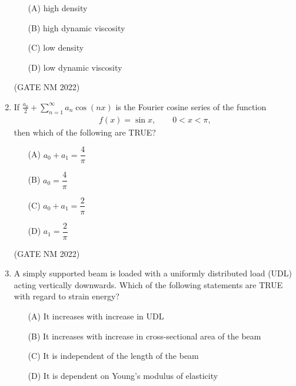 \documentclass[journal,12pt,onecolumn]{IEEEtran}
\theoremstyle{remark}
\begin{document}
\begin{enumerate}
	\begin{multicols}{2}

\begin{enumerate}
    \item[(A)] high density
    \item[(B)] high dynamic viscosity
    \item[(C)] low density
    \item[(D)] low dynamic viscosity
\end{enumerate}

	\end{multicols}

\hfill(GATE NM 2022)









\item  If
$
\frac{a_0}{2} + \sum_{n=1}^{\infty} a_n \cos(nx)
$
is the Fourier cosine series of the function
\begin{align*}
f(x)=\sin x,\qquad 0<x<\pi,
\end{align*}
then which of the following are TRUE?

\begin{multicols}{4}

\begin{enumerate}
	\item [(A)] $a_0 + a_1 = \dfrac{4}{\pi}$
	\item  [(B)] $a_0 = \dfrac{4}{\pi}$
	\item [(C)]  $a_0 + a_1 = \dfrac{2}{\pi}$
	\item  [(D)] $a_1 = \dfrac{2}{\pi}$
\end{enumerate}

\end{multicols}

\hfill(GATE NM 2022)





\item  A simply supported beam is loaded with a uniformly distributed load (UDL) acting vertically downwards. Which of the following statements are TRUE with regard to strain energy?

\begin{enumerate}
	\item  [(A)] It increases with increase in UDL
	\item  [(B)] It increases with increase in cross-sectional area of the beam
	\item  [(C)] It is independent of the length of the beam
	\item  [(D)] It is dependent on Young's modulus of elasticity
\end{enumerate}


\end{enumerate}
\end{document}
